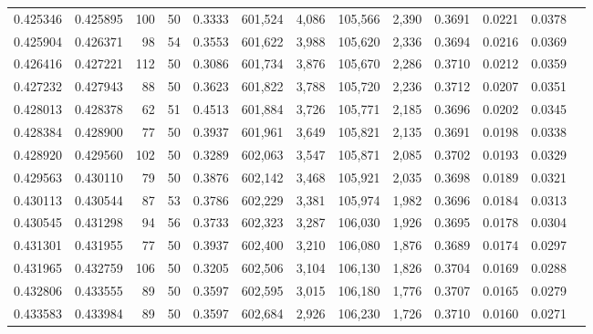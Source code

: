 \begin{tabular}{rrrrrrrrrrrrr}
0.425346 & 0.425895 &   100 &  50 &                                     0.3333 & 601,524 &   4,086 & 105,566 &   2,390 & 0.3691 & 0.0221 & 0.0378 \\
0.425904 & 0.426371 &    98 &  54 &                                     0.3553 & 601,622 &   3,988 & 105,620 &   2,336 & 0.3694 & 0.0216 & 0.0369 \\
0.426416 & 0.427221 &   112 &  50 &                                     0.3086 & 601,734 &   3,876 & 105,670 &   2,286 & 0.3710 & 0.0212 & 0.0359 \\
0.427232 & 0.427943 &    88 &  50 &                                     0.3623 & 601,822 &   3,788 & 105,720 &   2,236 & 0.3712 & 0.0207 & 0.0351 \\
0.428013 & 0.428378 &    62 &  51 &                                     0.4513 & 601,884 &   3,726 & 105,771 &   2,185 & 0.3696 & 0.0202 & 0.0345 \\
0.428384 & 0.428900 &    77 &  50 &                                     0.3937 & 601,961 &   3,649 & 105,821 &   2,135 & 0.3691 & 0.0198 & 0.0338 \\
0.428920 & 0.429560 &   102 &  50 &                                     0.3289 & 602,063 &   3,547 & 105,871 &   2,085 & 0.3702 & 0.0193 & 0.0329 \\
0.429563 & 0.430110 &    79 &  50 &                                     0.3876 & 602,142 &   3,468 & 105,921 &   2,035 & 0.3698 & 0.0189 & 0.0321 \\
0.430113 & 0.430544 &    87 &  53 &                                     0.3786 & 602,229 &   3,381 & 105,974 &   1,982 & 0.3696 & 0.0184 & 0.0313 \\
0.430545 & 0.431298 &    94 &  56 &                                     0.3733 & 602,323 &   3,287 & 106,030 &   1,926 & 0.3695 & 0.0178 & 0.0304 \\
0.431301 & 0.431955 &    77 &  50 &                                     0.3937 & 602,400 &   3,210 & 106,080 &   1,876 & 0.3689 & 0.0174 & 0.0297 \\
0.431965 & 0.432759 &   106 &  50 &                                     0.3205 & 602,506 &   3,104 & 106,130 &   1,826 & 0.3704 & 0.0169 & 0.0288 \\
0.432806 & 0.433555 &    89 &  50 &                                     0.3597 & 602,595 &   3,015 & 106,180 &   1,776 & 0.3707 & 0.0165 & 0.0279 \\
0.433583 & 0.433984 &    89 &  50 &                                     0.3597 & 602,684 &   2,926 & 106,230 &   1,726 & 0.3710 & 0.0160 & 0.0271 \\

\end{tabular}
